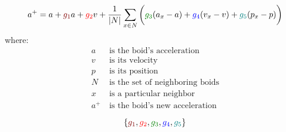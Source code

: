 \documentclass[22pt]{article}
\newcommand*{\mathcolor}{}
\def\mathcolor#1#{\mathcoloraux{#1}}
\newcommand*{\mathcoloraux}[3]{%
  \protect\leavevmode
  \begingroup
    \color#1{#2}#3%
  \endgroup
}
\begin{document}
$$a^{+} = a + \mathcolor{maroon}{g_1}a + \mathcolor{red}{g_2}v + \frac {1} {\lvert N \rvert} \sum_{x \in N}\bigg(\mathcolor{green}{g_3}(a_x-a)+\mathcolor{blue}{g_4}(v_x-v)+\mathcolor{teal}{g_5}(p_x-p)\bigg)$$
where:
\begin{align*}
a&~ \text{is the boid's acceleration}\\
v&~ \text{is its velocity}\\
p&~ \text{is its position}\\
N&~ \text{is the set of neighboring boids}\\
x&~ \text{is a particular neighbor}\\
a^{+}&~ \text{is the boid's new acceleration}
\end{align*}

$$\{ \mathcolor{maroon}{g_1}, \mathcolor{red}{g_2}, \mathcolor{green}{g_3}, \mathcolor{blue}{g_4}, \mathcolor{teal}{g_5} \}$$ 
\end{document}
